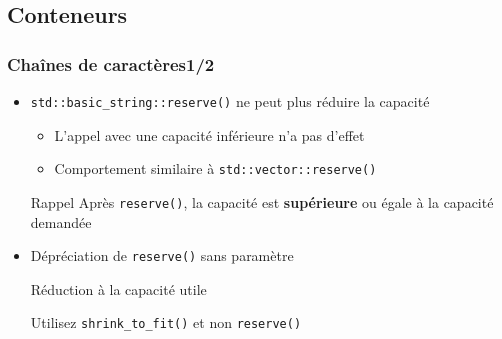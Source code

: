 \documentclass[C++.tex]{subfiles}
\begin{document}
\subsection*{Conteneurs}
\begin{frame}[fragile]
	\frametitle{Chaînes de caractères\titlehfill{}1/2}
	\begin{itemize}
		\item \lstinline|std::basic_string::reserve()| ne peut plus réduire la capacité
		\begin{itemize}
			\item L'appel avec une capacité inférieure n'a pas d'effet


			\item Comportement similaire à \lstinline|std::vector::reserve()|
		\end{itemize}

		\begin{block}{Rappel}
			Après \lstinline|reserve()|, la capacité est \textbf{supérieure} ou égale à la capacité demandée
		\end{block}

		\item Dépréciation de \lstinline|reserve()| sans paramètre

		\begin{block}{Réduction à la capacité utile}


			Utilisez \lstinline|shrink_to_fit()| et non \lstinline|reserve()|

		\end{block}
	\end{itemize}
\end{frame}
\end{document}
